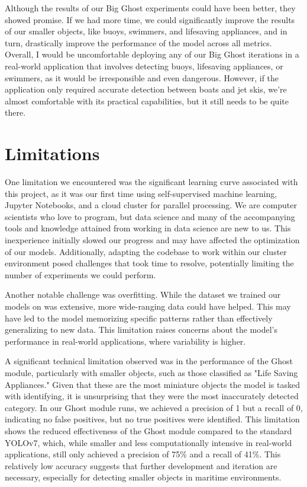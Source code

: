 \documentclass[sigplan,nonacm]{acmart}
\begin{document}
Although the results of our Big Ghost experiments could have been better, they showed promise. If we had more time, we could significantly improve the results of our smaller objects, like buoys, swimmers, and lifesaving appliances, and in turn, drastically improve the performance of the model across all metrics. Overall, I would be uncomfortable deploying any of our Big Ghost iterations in a real-world application that involves detecting buoys, lifesaving appliances, or swimmers, as it would be irresponsible and even dangerous. However, if the application only required accurate detection between boats and jet skis, we're almost comfortable with its practical capabilities, but it still needs to be quite there. 

\section*{Limitations}
One limitation we encountered was the significant learning curve associated with this project, as it was our first time using self-supervised machine learning, Jupyter Notebooks, and a cloud cluster for parallel processing. We are computer scientists who love to program, but data science and many of the accompanying tools and knowledge attained from working in data science are new to us. This inexperience initially slowed our progress and may have affected the optimization of our models. Additionally, adapting the codebase to work within our cluster environment posed challenges that took time to resolve, potentially limiting the number of experiments we could perform.

Another notable challenge was overfitting. While the dataset we trained our models on was extensive, more wide-ranging data could have helped. This may have led to the model memorizing specific patterns rather than effectively generalizing to new data. This limitation raises concerns about the model's performance in real-world applications, where variability is higher.

A significant technical limitation observed was in the performance of the Ghost module, particularly with smaller objects, such as those classified as "Life Saving Appliances." Given that these are the most miniature objects the model is tasked with identifying, it is unsurprising that they were the most inaccurately detected category. In our Ghost module runs, we achieved a precision of 1 but a recall of 0, indicating no false positives, but no true positives were identified. This limitation shows the reduced effectiveness of the Ghost module compared to the standard YOLOv7, which, while smaller and less computationally intensive in real-world applications, still only achieved a precision of 75\% and a recall of 41\%. This relatively low accuracy suggests that further development and iteration are necessary, especially for detecting smaller objects in maritime environments.
\end{document}
